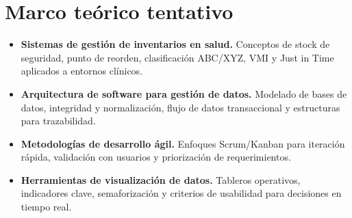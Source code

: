 \section{Marco teórico tentativo}
\label{sec:marco_teorico_tentativo}

\begin{itemize}
    \item \textbf{Sistemas de gestión de inventarios en salud.} Conceptos de stock de seguridad, punto de reorden, clasificación ABC/XYZ, VMI y Just in Time aplicados a entornos clínicos.
    \item \textbf{Arquitectura de software para gestión de datos.} Modelado de bases de datos, integridad y normalización, flujo de datos transaccional y estructuras para trazabilidad.
    \item \textbf{Metodologías de desarrollo ágil.} Enfoques Scrum/Kanban para iteración rápida, validación con usuarios y priorización de requerimientos.
    \item \textbf{Herramientas de visualización de datos.} Tableros operativos, indicadores clave, semaforización y criterios de usabilidad para decisiones en tiempo real.
\end{itemize}
